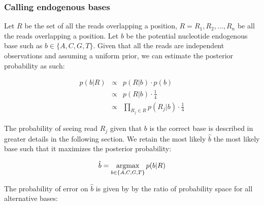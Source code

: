 \documentclass[a4paper,12pt]{article}
\newcommand{\argmax}{\operatornamewithlimits{argmax}}
\begin{document}
\begin{itemize}
\begin{itemize}





































\subsubsection{Calling endogenous bases}
\label{sec:callingendobase}

\noindent Let $R$ be the set of all the reads overlapping a position, $R={R_1,R_2,...,R_n}$ be all the reads overlapping a position.  Let $b$ be the potential nucleotide endogenous base such as $b\in\{A,C,G,T\}$. Given that all the reads are independent observations and assuming a uniform prior, we can estimate the posterior probability as such:

\begin{eqnarray}
  p(b|R)   & \propto & p(R|b) \cdot p(b)  \\
  & \propto & p(R|b) \cdot \frac {1} {4} \\
  & \propto & \prod_{R_j \in R} p(R_j|b) \cdot \frac {1} {4} 
  \label{eqn:idenp}
\end{eqnarray} 


\noindent The probability of seeing read $R_j$ given that $b$ is the correct base is described in greater details in the following section.  We retain the most likely $\hat{b}$ the most likely base such that it maximizes the posterior probability:

\begin{equation}
  \hat{b} = \argmax_{b \in \{A,C,G,T\} }   p(b|R)
\end{equation} 


\noindent  The probability of error on $\hat{b}$ is given by by the ratio of probability space for all alternative bases:


\end{itemize}
\end{itemize}
\end{document}
